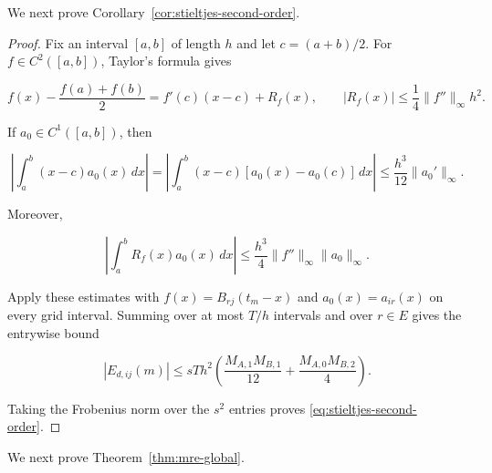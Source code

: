 \documentclass[3p,12pt,authoryear]{elsarticle}
\theoremstyle{definition}
\theoremstyle{remark}
\begin{document}
We next prove Corollary~\ref{cor:stieltjes-second-order}.

\begin{proof}
Fix an interval $[a,b]$ of length $h$ and let $c=(a+b)/2$. For $f\in C^2([a,b])$, Taylor's formula gives

\begin{equation*}
f(x)-\frac{f(a)+f(b)}{2}
=
f'(c)(x-c)+R_f(x),
\qquad
|R_f(x)|\leq\frac14\|f''\|_{\infty}h^2.
\end{equation*}

If $a_0\in C^1([a,b])$, then

\begin{equation*}
\left|\int_a^b(x-c)a_0(x)\,dx\right|
=
\left|\int_a^b(x-c)[a_0(x)-a_0(c)]\,dx\right|
\leq
\frac{h^3}{12}\|a_0'\|_{\infty}.
\end{equation*}

Moreover,

\begin{equation*}
\left|\int_a^bR_f(x)a_0(x)\,dx\right|
\leq
\frac{h^3}{4}\|f''\|_{\infty}\|a_0\|_{\infty}.
\end{equation*}

Apply these estimates with $f(x)=B_{rj}(t_m-x)$ and $a_0(x)=a_{ir}(x)$ on every grid interval. Summing over at most $T/h$ intervals and over $r\in E$ gives the entrywise bound

\begin{equation*}
|E_{d,ij}(m)|
\leq
sT h^2
\left(
\frac{M_{A,1}M_{B,1}}{12}
+
\frac{M_{A,0}M_{B,2}}{4}
\right).
\end{equation*}

Taking the Frobenius norm over the $s^2$ entries proves \eqref{eq:stieltjes-second-order}.
\end{proof}

We next prove Theorem~\ref{thm:mre-global}.
\end{document}
